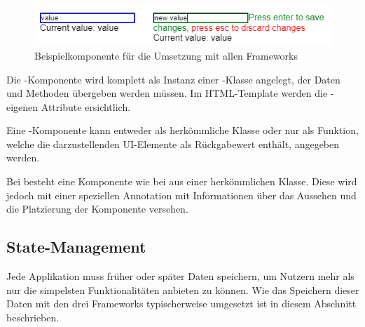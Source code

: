 \begin{figure}
    \centering
    \captionsetup{justification=centering}
    \includegraphics{figures/example_component.png}
        \caption{Beispielkomponente für die Umsetzung mit allen Frameworks}\label{fig:example_component}
\end{figure}

Die -Komponente wird komplett als Instanz einer -Klasse angelegt, der Daten und Methoden übergeben werden müssen. Im HTML-Template werden die -eigenen Attribute ersichtlich.



Eine -Komponente kann entweder als herkömmliche Klasse oder nur als Funktion, welche die darzustellenden UI-Elemente als Rückgabewert enthält, angegeben werden.





Bei  besteht eine Komponente wie bei  aus einer herkömmlichen Klasse. Diese wird jedoch mit einer speziellen Annotation mit Informationen über das Aussehen und die Platzierung der Komponente versehen.



\subsection{State-Management}
Jede Applikation muss früher oder später Daten speichern, um Nutzern mehr als nur die simpelsten Funktionalitäten anbieten zu können. Wie das Speichern dieser Daten mit den drei Frameworks typischerweise umgesetzt ist in diesem Abschnitt beschrieben.

